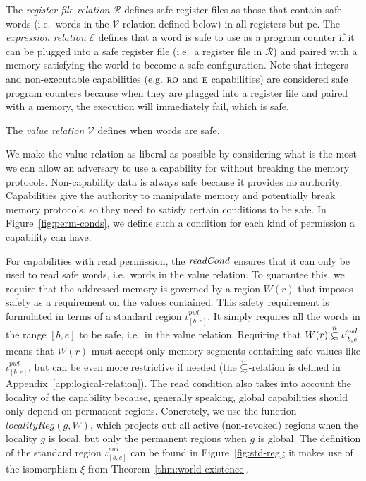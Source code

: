 \documentclass[format=acmsmall, review=true, screen=true]{acmart}
\renewcommand{\figurename}{Figure}
\newcommand\subsetsim{\mathrel{\ooalign{\raise.2ex\hbox{$\subset$}\cr
      \hidewidth\lower.8ex\hbox{\scalebox{0.9}{$\sim$}}\hidewidth\cr}}}
\newcommand{\nsubsim}[1][n]{\stackrel{\tiny{#1}}{\subsetsim}}
\newcommand{\var}[1]{\mathit{#1}}
\newcommand{\gl}{\var{g}}
\newcommand{\pcreg}{\mathrm{pc}}
\newcommand{\start}{\var{b}}
\newcommand{\addrend}{\var{e}}
\newcommand{\pwl}{\var{pwl}}
\newcommand{\plainfun}[2]{
  \ifthenelse{\equal{#2}{}}
  {\mathit{#1}}
  {\mathit{#1}(#2)}
}
\newcommand{\readCond}[1]{\plainfun{readCond}{#1}}
\newcommand{\asmType}{\plaindom{AsmType}}
\newcommand{\plaindom}[1]{\mathrm{#1}}
\newcommand{\UPred}[1]{\plaindom{UPred}(#1)}
\newcommand{\intr}[2]{\mathcal{#1}}
\newcommand{\valueintr}[1]{\intr{V}{#1}}
\newcommand{\exprintr}[1]{\intr{E}{#1}}
\newcommand{\regintr}[1]{\intr{R}{#1}}
\newcommand{\stdvr}{\valueintr{\asmType}}
\newcommand{\stder}{\exprintr{\asmType}}
\newcommand{\stdrr}{\regintr{\asmType}}
\newcommand{\plainperm}[1]{\textsc{#1}}
\newcommand{\readonly}{\plainperm{ro}}
\newcommand{\entry}{\plainperm{e}}
\newcommand{\itoplassug}[1]{}
\begin{document}
The \emph{register-file relation} $\stdrr$ defines safe register-files as those
that contain safe words (i.e.\ words in the $\stdvr$-relation defined below) in all registers but $\pcreg$.
The \emph{expression relation} $\stder$ defines that a word is safe to use as a
program counter if it can be plugged into a safe register file (i.e.\ a register
file in $\stdrr$) and paired with a memory satisfying the world to become a safe
configuration. Note that integers and non-executable capabilities (e.g.
$\readonly$ and $\entry$ capabilities) are considered safe program counters
because when they are plugged into a register file and paired with a memory, the
execution will immediately fail, which is safe.

The \emph{value relation} $\stdvr$ defines when words are safe.
\itoplassug{Explain why we use $\UPred{}$ with reference to the introduction of this section.}
We make the
value relation as liberal as possible by considering what is the most we can
allow an adversary to use a capability for without breaking the memory
protocols. Non-capability data is always safe because it provides no
authority. Capabilities give the authority to manipulate memory and potentially
break memory protocols, so they need to satisfy certain conditions to be
safe. In \figurename~\ref{fig:perm-conds}, we define such a condition for each
kind of permission a capability can have.

For capabilities with read permission, the $\readCond{}$ ensures that it can
only be used to read safe words, i.e.\ words in the value relation. To guarantee
this, we require that the addressed memory is governed by a region $W(r)$ that
imposes safety as a requirement on the values contained. This safety requirement
is formulated in terms of a standard region $\iota^\pwl_{[\start,\addrend]}$. It simply
requires all the words in the range $[\start,\addrend]$ to be safe, i.e.\ in the
value relation. Requiring that $W(r)\nsubsim[n]\iota^\pwl_{[\start,\addrend]}$
means that $W(r)$ must accept only memory segments containing safe values like
$\iota^\pwl_{[\start,\addrend]}$, but can be even more restrictive if needed
(the $\nsubsim[n]$-relation is defined in Appendix~\ref{app:logical-relation}). The
read condition also takes into account the locality of the capability because,
generally speaking, global capabilities should only depend on permanent regions.
Concretely, we use the function $\var{localityReg}(\gl,W)$, which projects out
all active (non-revoked) regions when the locality $\gl$ is local, but only the
permanent regions when $\gl$ is global. The definition of the standard region
$\iota^\pwl_{[\start,\addrend]}$ can be found
in \figurename~\ref{fig:std-reg}; it makes use of the isomorphism $\xi$ from
Theorem~\ref{thm:world-existence}.
\end{document}
